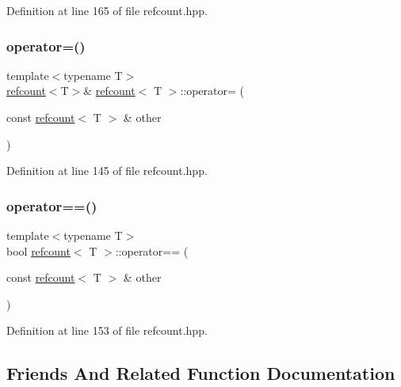 Definition at line 165 of file refcount.\+hpp.

\mbox{\label{structrefcount_aa18a822e0cffd8f895ba5e774c110b6b}} 
\subsubsection{\texorpdfstring{operator=()}{operator=()}}
{\footnotesize\ttfamily template$<$typename T$>$ \\
\hyperlink{structrefcount}{refcount}$<$T$>$\& \hyperlink{structrefcount}{refcount}$<$ T $>$\+::operator= (\begin{DoxyParamCaption}\item[{const \hyperlink{structrefcount}{refcount}$<$ T $>$ \&}]{other }\end{DoxyParamCaption})\hspace{0.3cm}{\ttfamily [inline]}}



Definition at line 145 of file refcount.\+hpp.

\mbox{\label{structrefcount_a9d655b5a498d3153b86f49e34ba80a0b}} 
\subsubsection{\texorpdfstring{operator==()}{operator==()}}
{\footnotesize\ttfamily template$<$typename T$>$ \\
bool \hyperlink{structrefcount}{refcount}$<$ T $>$\+::operator== (\begin{DoxyParamCaption}\item[{const \hyperlink{structrefcount}{refcount}$<$ T $>$ \&}]{other }\end{DoxyParamCaption})\hspace{0.3cm}{\ttfamily [inline]}}



Definition at line 153 of file refcount.\+hpp.



\subsection{Friends And Related Function Documentation}
\mbox{\label{structrefcount_a94a77cab99e5f70bb9abded7f88d984e}} 
